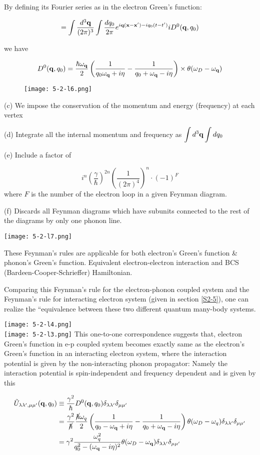 By defining its Fourier series as in the electron Green's function:

\[=\int \frac{d^3\bf q}{(2\pi)^3}\int \frac{d q_0}{2\pi}e^{i{\bf q(x-x')}-iq_0(t-t')}iD^0({\bf q},q_0) \]

we have

\[D^0({\bf q},q_0)=\frac{\hbar\omega_{\bf q}}{2}\left(\frac{1}{q_0\omega_{\bf q}+i\eta}-\frac{1}{q_0+\omega_{\bf q}-i\eta}\right)\times\theta(\omega_D-\omega_{\bf q}) \]

\begin{wrapfigure}{l}{3cm}
\texttt{[image: 5-2-l6.png]}
\end{wrapfigure}
\noindent (c) We impose the conservation of the momentum and energy (frequency) at each vertex

\noindent (d) Integrate all the internal momentum and frequency as $\displaystyle\int d^3{\bf q}\int dq_0$

\noindent (e) Include a factor of

\[i^n\left(\frac{\gamma}{\hbar}\right)^{2n}\left(\frac{1}{(2\pi)^4}\right)^n\cdot(-1)^F \]
where $F$ is the number of the electron loop in a given Feynman diagram. 

\noindent (f) Discards all Feynman diagrams which have subunits connected to the rest of the diagrams by only one phonon line. 

\texttt{[image: 5-2-l7.png]}

These Feynman's rules are applicable for both electron's Green's function \& phonon's Green's function. Equivalent electron-electron interaction and BCS (Bardeen-Cooper-Schrieffer) Hamiltonian. 

Comparing this Feynman's rule for the electron-phonon coupled system and the Feynman's rule for interacting electron system (given in section \ref{S2-5}), one can realize the ``equivalence between these two different quantum many-body systems. 

\newpage
\texttt{[image: 5-2-l4.png]}\\
\texttt{[image: 5-2-l3.png]}
\newpage
This one-to-one correspondence suggests that, electron Green's function in e-p coupled system becomes exactly same as the electron's Green's function in an interacting electron system, where the interaction potential is given by the non-interacting phonon propagator: Namely the interaction potential is spin-independent and frequency dependent and is given by this

\[\begin{split}
\tilde{U}_{\lambda\lambda',\mu\mu'}({\bf q},q_0)&\equiv\frac{\gamma^2}{\hbar}D^0({\bf q},q_0)\delta_{\lambda\lambda'}\delta_{\mu\mu'}\\
&=\frac{\gamma^2}{\cancel\hbar}\frac{\cancel{\hbar}\omega_q}{2}\left(\frac{1}{q_0-\omega_{\bf q}+i\eta} - \frac{1}{q_0+\omega_{\bf q}-i\eta}\right)\theta(\omega_D-\omega_q)\delta_{\lambda\lambda'}\delta_{\mu\mu'}\\
&=\gamma^2\frac{\omega_q^2}{q_0^2-(\omega_{\bf q}-i\eta)^2}\theta(\omega_D-\omega_{\bf q})\delta_{\lambda\lambda'}\delta_{\mu\mu'}
\end{split} \]


